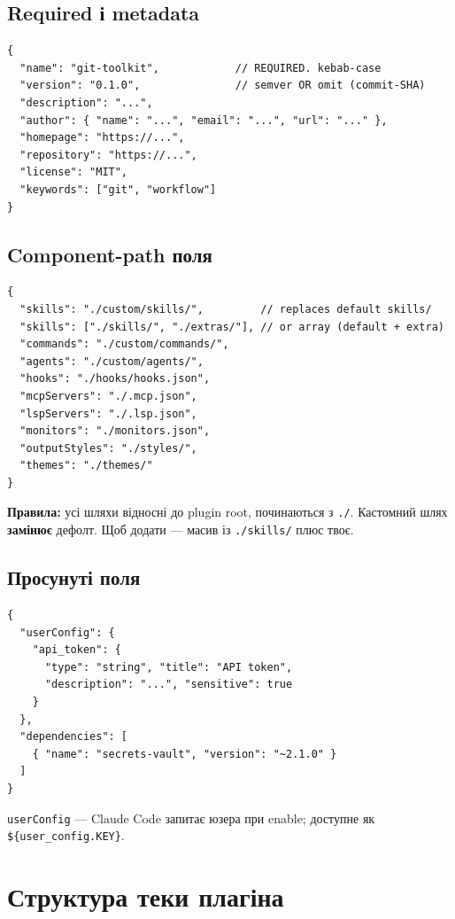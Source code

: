 \documentclass[11pt,a4paper]{article}
\begin{document}
\subsection{Required і metadata}

\begin{lstlisting}
{
  "name": "git-toolkit",            // REQUIRED. kebab-case
  "version": "0.1.0",               // semver OR omit (commit-SHA)
  "description": "...",
  "author": { "name": "...", "email": "...", "url": "..." },
  "homepage": "https://...",
  "repository": "https://...",
  "license": "MIT",
  "keywords": ["git", "workflow"]
}
\end{lstlisting}

\subsection{Component-path поля}

\begin{lstlisting}
{
  "skills": "./custom/skills/",         // replaces default skills/
  "skills": ["./skills/", "./extras/"], // or array (default + extra)
  "commands": "./custom/commands/",
  "agents": "./custom/agents/",
  "hooks": "./hooks/hooks.json",
  "mcpServers": "./.mcp.json",
  "lspServers": "./.lsp.json",
  "monitors": "./monitors.json",
  "outputStyles": "./styles/",
  "themes": "./themes/"
}
\end{lstlisting}

\textbf{Правила:} усі шляхи відносні до plugin root, починаються з \texttt{./}. Кастомний шлях \textbf{замінює} дефолт. Щоб додати --- масив із \texttt{./skills/} плюс твоє.

\subsection{Просунуті поля}

\begin{lstlisting}
{
  "userConfig": {
    "api_token": {
      "type": "string", "title": "API token",
      "description": "...", "sensitive": true
    }
  },
  "dependencies": [
    { "name": "secrets-vault", "version": "~2.1.0" }
  ]
}
\end{lstlisting}

\texttt{userConfig} --- Claude Code запитає юзера при enable; доступне як \texttt{\$\{user\_config.KEY\}}.

\section{Структура теки плагіна}
\end{document}
